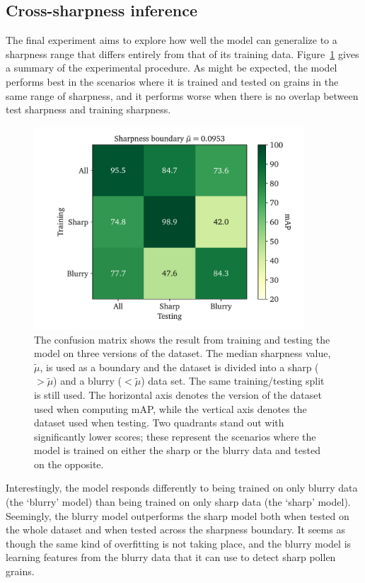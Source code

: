 \subsection{Cross-sharpness inference}
The final experiment aims to explore how well the model can generalize to a sharpness range that differs entirely from that of its training data.
Figure~\ref{fig:results-sharpness-inference} gives a summary of the experimental procedure.
As might be expected, the model performs best in the scenarios where it is trained and tested on grains in the same range of sharpness, and it performs worse when there is no overlap between test sharpness and training sharpness.

\begin{figure}[htbp]
  \centering
  \includegraphics[width=0.9\textwidth]{figs/results/sharpness/confustion_balanced_test_map.pdf}
  \caption[mAP across sharpness boundary]{%
The confusion matrix shows the result from training and testing the model on three versions of the dataset.
The median sharpness value, \(\tilde{\mu}\), is used as a boundary and the dataset is divided into a sharp (\(>\tilde{\mu}\)) and a blurry (\(<\tilde{\mu}\)) data set.
The same training/testing split is still used.
The horizontal axis denotes the version of the dataset used when computing mAP, while the vertical axis denotes the dataset used when testing.
Two quadrants stand out with significantly lower scores; these represent the scenarios where the model is trained on either the sharp or the blurry data and tested on the opposite.
  }\label{fig:results-sharpness-inference}
\end{figure}

Interestingly, the model responds differently to being trained on only blurry data (the `blurry' model) than being trained on only sharp data (the `sharp' model).
Seemingly, the blurry model outperforms the sharp model both when tested on the whole dataset and when tested across the sharpness boundary.
It seems as though the same kind of overfitting is not taking place, and the blurry model is learning features from the blurry data that it can use to detect sharp pollen grains.

